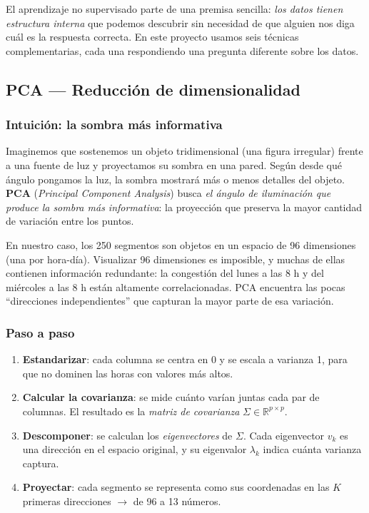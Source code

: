 \documentclass[12pt,a4paper]{article}
\begin{document}
El aprendizaje no supervisado parte de una premisa sencilla:
\textit{los datos tienen estructura interna} que podemos descubrir sin
necesidad de que alguien nos diga cuál es la respuesta correcta.
En este proyecto usamos seis técnicas complementarias, cada una respondiendo
una pregunta diferente sobre los datos.

\subsection{PCA --- Reducción de dimensionalidad}

\subsubsection{Intuición: la sombra más informativa}

Imaginemos que sostenemos un objeto tridimensional (una figura irregular)
frente a una fuente de luz y proyectamos su sombra en una pared.
Según desde qué ángulo pongamos la luz, la sombra mostrará más o menos
detalles del objeto.
\textbf{PCA} (\textit{Principal Component Analysis}) busca
\emph{el ángulo de iluminación que produce la sombra más informativa}:
la proyección que preserva la mayor cantidad de variación entre los puntos.

En nuestro caso, los 250 segmentos son objetos en un espacio de 96
dimensiones (una por hora-día).
Visualizar 96 dimensiones es imposible, y muchas de ellas contienen
información redundante: la congestión del lunes a las 8 h y del miércoles
a las 8 h están altamente correlacionadas.
PCA encuentra las pocas ``direcciones independientes'' que capturan la
mayor parte de esa variación.

\subsubsection{Paso a paso}

\begin{enumerate}[noitemsep]
  \item \textbf{Estandarizar}: cada columna se centra en 0 y se escala a
    varianza 1, para que no dominen las horas con valores más altos.
  \item \textbf{Calcular la covarianza}: se mide cuánto varían juntas cada
    par de columnas. El resultado es la \emph{matriz de covarianza}
    $\Sigma \in \mathbb{R}^{p \times p}$.
  \item \textbf{Descomponer}: se calculan los \emph{eigenvectores}
    de $\Sigma$. Cada eigenvector $v_k$ es una dirección en el espacio
    original, y su eigenvalor $\lambda_k$ indica cuánta varianza captura.
  \item \textbf{Proyectar}: cada segmento se representa como sus coordenadas
    en las $K$ primeras direcciones $\to$ de 96 a 13 números.
\end{enumerate}
\end{document}
